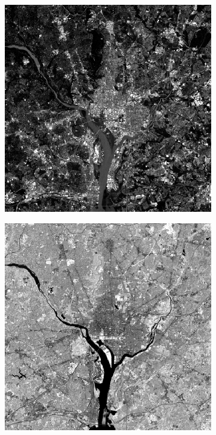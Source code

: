 \begin{figure}[h!]
\begin{subfigure}[b]{0.3\linewidth}
		\caption{}
		\label{fig:band2}
	\end{subfigure}
	\begin{subfigure}[b]{0.3\linewidth}
		\includegraphics[width=\linewidth]{myfigure/p10/WashingtonDC_Band3.png}
		\caption{}
		\label{fig:band3}
	\end{subfigure}
	\begin{subfigure}[b]{0.3\linewidth}
		\includegraphics[width=\linewidth]{myfigure/p10/WashingtonDC_Band4.png}

\end{subfigure}
\end{figure}
